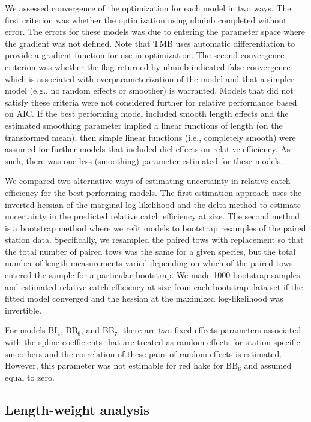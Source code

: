 \documentclass[
  12pt,
]{article}
\begin{document}
We assessed convergence of the optimization for each model in two ways.
The first criterion was whether the optimization using nlminb completed
without error. The errors for these models was due to entering the
parameter space where the gradient was not defined. Note that TMB uses
automatic differentiation to provide a gradient function for use in
optimization. The second convergence criterion was whether the flag
returned by nlminb indicated false convergence which is associated with
overparameterization of the model and that a simpler model (e.g., no
random effects or smoother) is warranted. Models that did not satisfy
these criteria were not considered further for relative performance
based on AIC. If the best performing model included smooth length
effects and the estimated smoothing parameter implied a linear functions
of length (on the transformed mean), then simple linear functions (i.e.,
completely smooth) were assumed for further models that included diel
effects on relative efficiency. As such, there was one less (smoothing)
parameter estimated for these models.

We compared two alternative ways of estimating uncertainty in relative
catch efficiency for the best performing models. The first estimation
approach uses the inverted hessian of the marginal log-likelihood and
the delta-method to estimate uncertainty in the predicted relative catch
efficiency at size. The second method is a bootstrap method where we
refit models to bootstrap resamples of the paired station data.
Specifically, we resampled the paired tows with replacement so that the
total number of paired tows was the same for a given species, but the
total number of length measurements varied depending on which of the
paired tows entered the sample for a particular bootstrap. We made 1000
bootstrap samples and estimated relative catch efficiency at size from
each bootstrap data set if the fitted model converged and the hessian at
the maximized log-likelihood was invertible.

For models BI\(_4\), BB\(_6\), and BB\(_7\), there are two fixed effects
parameters associated with the spline coefficients that are treated as
random effects for station-specific smoothers and the correlation of
these pairs of random effects is estimated. However, this parameter was
not estimable for red hake for BB\(_6\) and assumed equal to zero.

\hypertarget{length-weight-analysis}{%
\subsection{Length-weight analysis}\label{length-weight-analysis}}
\end{document}

